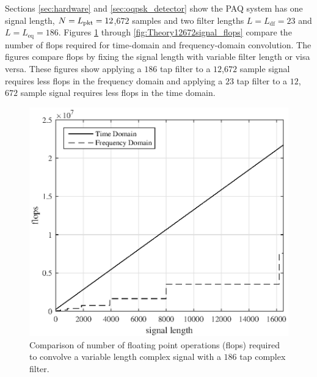 Sections \ref{sec:hardware} and \ref{sec:oqpsk_detector} show the PAQ system has one signal length, $N = L_\text{pkt} = 12$,$672$ samples and two filter lengths $L = L_\text{df} = 23$ and $L = L_\text{eq} = 186$.
Figures \ref{fig:Theory186Tap_flops} through \ref{fig:Theory12672signal_flops} compare the number of flops required for time-domain and frequency-domain convolution.
The figures compare flops by fixing the signal length with variable filter length or visa versa.
These figures show applying a $186$ tap filter to a $12$,$672$ sample signal requires less flops in the frequency domain and
applying a $23$ tap filter to a $12$,$672$ sample signal requires less flops in the time domain.
\begin{figure}
	\centering\includegraphics[width=5in]{figures/gpu_intro/Theory186Tap_flops.eps}
	\caption{Comparison of number of floating point operations (flops) required to convolve a variable length complex signal with a $186$ tap complex filter.}
	\label{fig:Theory186Tap_flops}
\end{figure}
